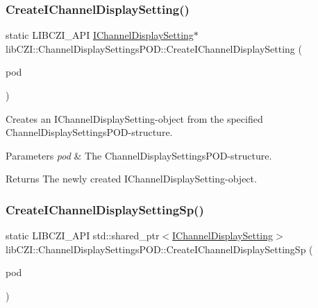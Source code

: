 \subsubsection{\texorpdfstring{Create\+I\+Channel\+Display\+Setting()}{CreateIChannelDisplaySetting()}}
{\footnotesize\ttfamily static L\+I\+B\+C\+Z\+I\+\_\+\+A\+PI \hyperlink{classlib_c_z_i_1_1_i_channel_display_setting}{I\+Channel\+Display\+Setting}$\ast$ lib\+C\+Z\+I\+::\+Channel\+Display\+Settings\+P\+O\+D\+::\+Create\+I\+Channel\+Display\+Setting (\begin{DoxyParamCaption}\item[{const \hyperlink{structlib_c_z_i_1_1_channel_display_settings_p_o_d}{Channel\+Display\+Settings\+P\+OD} \&}]{pod }\end{DoxyParamCaption})\hspace{0.3cm}{\ttfamily [static]}}

Creates an I\+Channel\+Display\+Setting-\/object from the specified Channel\+Display\+Settings\+P\+O\+D-\/structure. 
\begin{DoxyParams}{Parameters}
{\em pod} & The Channel\+Display\+Settings\+P\+O\+D-\/structure. \\
\hline
\end{DoxyParams}
\begin{DoxyReturn}{Returns}
The newly created I\+Channel\+Display\+Setting-\/object. 
\end{DoxyReturn}
\mbox{\label{structlib_c_z_i_1_1_channel_display_settings_p_o_d_a4c4582399de4ebc3ac1b69f043d0ebd1}} 
\subsubsection{\texorpdfstring{Create\+I\+Channel\+Display\+Setting\+Sp()}{CreateIChannelDisplaySettingSp()}}
{\footnotesize\ttfamily static L\+I\+B\+C\+Z\+I\+\_\+\+A\+PI std\+::shared\+\_\+ptr$<$\hyperlink{classlib_c_z_i_1_1_i_channel_display_setting}{I\+Channel\+Display\+Setting}$>$ lib\+C\+Z\+I\+::\+Channel\+Display\+Settings\+P\+O\+D\+::\+Create\+I\+Channel\+Display\+Setting\+Sp (\begin{DoxyParamCaption}\item[{const \hyperlink{structlib_c_z_i_1_1_channel_display_settings_p_o_d}{Channel\+Display\+Settings\+P\+OD} \&}]{pod }\end{DoxyParamCaption})\hspace{0.3cm}{\ttfamily [static]}}


